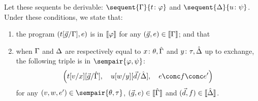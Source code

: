 \begin{proposition}[Adequacy]
 \label{c:adequacy}
 Let these sequents be derivable:
 $  \sequent{\G}{\tj{t}{\phi}} $
 and
 $  \sequent{\D}{\tj{u}{\psi}}$\enspace.
 Under these conditions, we state that:
 \begin{enumerate}[label=(\arabic{*}), ref=\textit{(\arabic{*})}]
  \item \label{c:first} the program
	$
	(t[\vec{g}/\Gamma], e)
	$
	is in $\llbracket{\varphi}\rrbracket$
	 for any
	$(\vec{g},e)\in\llbracket{\Gamma}\rrbracket$; and that
  \item \label{c:second}
	when $\Gamma$ and $\Delta$ are respectively
	equal to ${x} \colon{\theta}, \hat{\Gamma}$ and ${y} \colon{\tau}, \hat{\Delta}$ up to exchange,
	the following triple is in $\sempair{\phi,\psi}$:
	\[\left(
	t[v/x][\vec g/\hat \G],\quad
	u[w/y][\vec d/\hat \D],\quad
	 e \conc  f \conc e'
	\right)
	\]
	for any
	$(v,w,e')\in\sempair{\theta,\tau}$,
	$(\vec g, e)\in\llbracket{\hat{\Gamma}}\rrbracket$ and
	$(\vec d, f)\in\llbracket{\hat{\Delta}}\rrbracket$.
  \end{enumerate}
\end{proposition}
